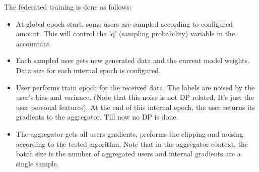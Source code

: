 The federated training is done as follows:
\begin{itemize}
    \item At global epoch start, some users are sampled according to configured amount. This will control the 'q' (sampling probability) variable in the accountant
    \item Each sampled user gets new generated data and the current model weights. Data size for each internal epoch is configured. 
    \item User performs train epoch for the received data. The labels are noised by the user's bias and variance. (Note that this noise is not DP related,  It's just the user personal features). At the end of this internal epoch, the user returns its gradients to the aggregator. Till now no DP is done.
    \item The aggregator gets all users gradients, preforms the clipping and noising according to the tested algorithm. Note that in the aggregator context, the batch size is the number of aggregated users and internal gradients are a single sample.
    
\end{itemize}
 
